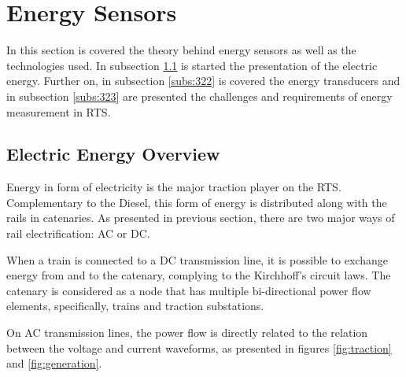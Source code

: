 


\section{Energy Sensors}


In this section is covered the theory behind energy sensors as well as the technologies used. In subsection \ref{subs:321} is started the presentation of the electric energy. Further on, in subsection \ref{subs:322} is covered the energy transducers and in subsection \ref{subs:323} are presented the challenges and requirements of energy measurement in \ac{RTS}. 

\subsection{Electric Energy Overview}
\label{subs:321}
Energy in form of electricity is the major traction player on the \ac{RTS}. 
Complementary to the Diesel, this form of energy is distributed along with the rails in catenaries.
As presented in previous section, there are two major ways of rail electrification: \ac{AC} or \ac{DC}.

When a train is connected to a DC transmission line, it is possible to exchange energy from and to the catenary, complying to the Kirchhoff's circuit laws. The catenary is considered as a node that has multiple bi-directional power flow elements, specifically, trains and traction substations.

On \ac{AC} transmission lines, the power flow is directly related to the relation between the voltage and current waveforms, as presented in figures \ref{fig:traction} and \ref{fig:generation}.

